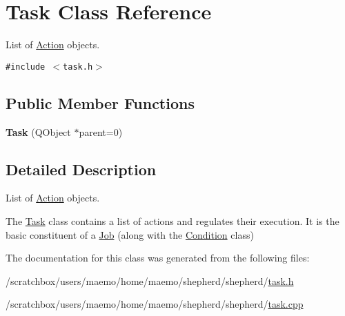 \hypertarget{class_task}{
\section{Task Class Reference}
\label{class_task}
}
List of \hyperlink{interface_action}{Action} objects.  


{\tt \#include $<$task.h$>$}

\subsection*{Public Member Functions}
\begin{CompactItemize}
\item 
\hypertarget{class_task_735ce7d6c4f28172d8d6493541cc91e7}{
\textbf{Task} (QObject $\ast$parent=0)}
\label{class_task_735ce7d6c4f28172d8d6493541cc91e7}

\end{CompactItemize}


\subsection{Detailed Description}
List of \hyperlink{interface_action}{Action} objects. 

The \hyperlink{class_task}{Task} class contains a list of actions and regulates their execution. It is the basic constituent of a \hyperlink{class_job}{Job} (along with the \hyperlink{class_condition}{Condition} class) 

The documentation for this class was generated from the following files:\begin{CompactItemize}
\item 
/scratchbox/users/maemo/home/maemo/shepherd/shepherd/\hyperlink{task_8h}{task.h}\item 
/scratchbox/users/maemo/home/maemo/shepherd/shepherd/\hyperlink{task_8cpp}{task.cpp}\end{CompactItemize}
